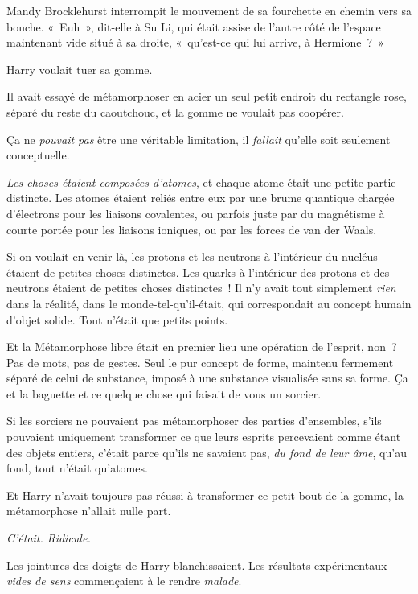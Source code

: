 \later

Mandy Brocklehurst interrompit le mouvement de sa fourchette en chemin vers sa bouche.
«~Euh~», dit-elle à Su Li, qui était assise de l'autre côté de l'espace maintenant vide situé à sa droite, «~qu'est-ce qui lui arrive, à Hermione~?~»

\later

Harry voulait tuer sa gomme.

Il avait essayé de métamorphoser en acier un seul petit endroit du rectangle rose, séparé du reste du caoutchouc, et la gomme ne voulait pas coopérer.

Ça ne \emph{pouvait pas} être une véritable limitation, il \emph{fallait} qu'elle soit seulement conceptuelle.

\emph{Les choses étaient composées d'atomes}, et chaque atome était une petite partie distincte.
Les atomes étaient reliés entre eux par une brume quantique chargée d'électrons pour les liaisons covalentes, ou parfois juste par du magnétisme à courte portée pour les liaisons ioniques, ou par les forces de van der Waals.

Si on voulait en venir là, les protons et les neutrons à l'intérieur du nucléus étaient de petites choses distinctes.
Les quarks à l'intérieur des protons et des neutrons étaient de petites choses distinctes~!
Il n'y avait tout simplement \emph{rien} dans la réalité, dans le monde-tel-qu'il-était, qui correspondait au concept humain d'objet solide.
Tout n'était que petits points.

Et la Métamorphose libre était en premier lieu une opération de l'esprit, non~?
Pas de mots, pas de gestes.
Seul le pur concept de forme, maintenu fermement séparé de celui de substance, imposé à une substance visualisée sans sa forme.
Ça et la baguette et ce quelque chose qui faisait de vous un sorcier.

Si les sorciers ne pouvaient pas métamorphoser des parties d'ensembles, s'ils pouvaient uniquement transformer ce que leurs esprits percevaient comme étant des objets entiers, c'était parce qu'ils ne savaient pas, \emph{du fond de leur âme}, qu'au fond, tout n'était qu'atomes.

Et Harry n'avait toujours pas réussi à transformer ce petit bout de la gomme, la métamorphose n'allait nulle part.

\emph{C'était.
Ridicule.}

Les jointures des doigts de Harry blanchissaient.
Les résultats expérimentaux \emph{vides de sens} commençaient à le rendre \emph{malade}.

